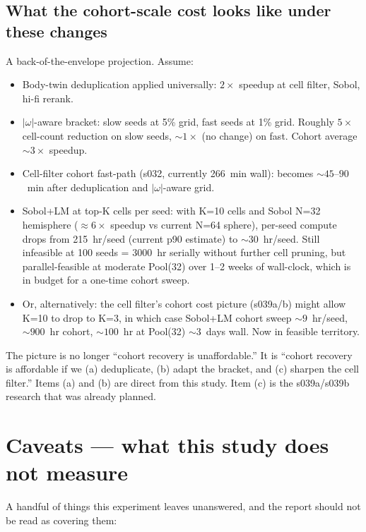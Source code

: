 \documentclass[11pt,a4paper]{article}
\begin{document}
\subsection{What the cohort-scale cost looks like under these changes}

A back-of-the-envelope projection. Assume:
\begin{itemize}
\item Body-twin deduplication applied universally: $2\times$ speedup at cell filter, Sobol, hi-fi rerank.
\item $|\omega|$-aware bracket: slow seeds at 5\% grid, fast seeds at 1\% grid. Roughly $5\times$ cell-count reduction on slow seeds, $\sim 1\times$ (no change) on fast. Cohort average $\sim 3\times$ speedup.
\item Cell-filter cohort fast-path (s032, currently 266~min wall): becomes $\sim 45\text{--}90$~min after deduplication and $|\omega|$-aware grid.
\item Sobol+LM at top-K cells per seed: with K=10 cells and Sobol N=32 hemisphere ($\approx 6\times$ speedup vs current N=64 sphere), per-seed compute drops from 215~hr/seed (current p90 estimate) to $\sim 30$~hr/seed. Still infeasible at 100 seeds = 3000~hr serially without further cell pruning, but parallel-feasible at moderate Pool(32) over 1--2 weeks of wall-clock, which is in budget for a one-time cohort sweep.
\item Or, alternatively: the cell filter's cohort cost picture (s039a/b) might allow K=10 to drop to K=3, in which case Sobol+LM cohort sweep $\sim 9$~hr/seed, $\sim 900$~hr cohort, $\sim 100$~hr at Pool(32) $\sim 3$~days wall. Now in feasible territory.
\end{itemize}

The picture is no longer ``cohort recovery is unaffordable.'' It is ``cohort recovery is affordable if we (a) deduplicate, (b) adapt the bracket, and (c) sharpen the cell filter.'' Items (a) and (b) are direct from this study. Item (c) is the s039a/s039b research that was already planned.

\section{Caveats — what this study does not measure}
\label{sec:caveats}

A handful of things this experiment leaves unanswered, and the report should not be read as covering them:
\end{document}
